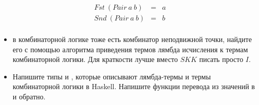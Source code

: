 \begin{eqnarray*}
     Fst\ (Pair\ a\ b) &=& a \\
     Snd\ (Pair\ a\ b) &=& b \\
\end{eqnarray*}

\begin{itemize}
\item
  в комбинаторной логике тоже есть комбинатор неподвижной точки, найдите
  его с помощью алгоритма приведения термов лямбда исчисления к термам
  комбинаторной логики. Для краткости лучше вместо $SKK$ писать просто
  $I$.
\item
  Напишите типы  и , которые описывают лямбда-термы и
  термы комбинаторной логики в Haskell. Напишите функции перевода из
  значений  в  и обратно.
\end{itemize}
